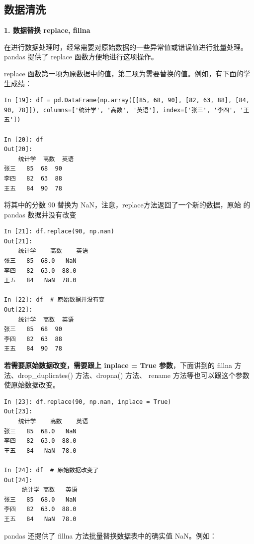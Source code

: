 \subsection{数据清洗}

\vspace{3pt}
\noindent\textbf{1. 数据替换 replace, fillna}
\vspace{3pt}

在进行数据处理时，经常需要对原始数据的一些异常值或错误值进行批量处理。 pandas 提供了 replace 函数方便地进行这项操作。

replace 函数第一项为原数据中的值，第二项为需要替换的值。例如，有下面的学生成绩：

\begin{lstlisting}[Language=Python]
In [19]: df = pd.DataFrame(np.array([[85, 68, 90], [82, 63, 88], [84, 90, 78]]), columns=['统计学', '高数', '英语'], index=['张三', '李四', '王五'])

In [20]: df
Out[20]:
    统计学  高数  英语
张三   85  68  90
李四   82  63  88
王五   84  90  78
\end{lstlisting}


将其中的分数 90 替换为 NaN，注意，replace方法返回了一个新的数据，原始 的 pandas 数据并没有改变

\begin{lstlisting}[Language=Python]
In [21]: df.replace(90, np.nan)
Out[21]:
    统计学    高数    英语
张三   85  68.0   NaN
李四   82  63.0  88.0
王五   84   NaN  78.0

In [22]: df  # 原始数据并没有变
Out[22]:
    统计学  高数  英语
张三   85  68  90
李四   82  63  88
王五   84  90  78
\end{lstlisting}

\textbf{若需要原始数据改变，需要跟上 inplace = True 参数}，下面讲到的 fillna 方法、drop\_duplicates() 方法、dropna() 方法、 rename 方法等也可以跟这个参数使原始数据改变。

\begin{lstlisting}[Language=Python]
In [23]: df.replace(90, np.nan, inplace = True)
Out[23]:
    统计学    高数    英语
张三   85  68.0   NaN
李四   82  63.0  88.0
王五   84   NaN  78.0

In [24]: df  # 原始数据改变了
Out[24]:
     统计学 高数   英语
张三   85  68.0   NaN
李四   82  63.0  88.0
王五   84   NaN  78.0
\end{lstlisting}


pandas 还提供了 fillna 方法批量替换数据表中的确实值 NaN。例如：

